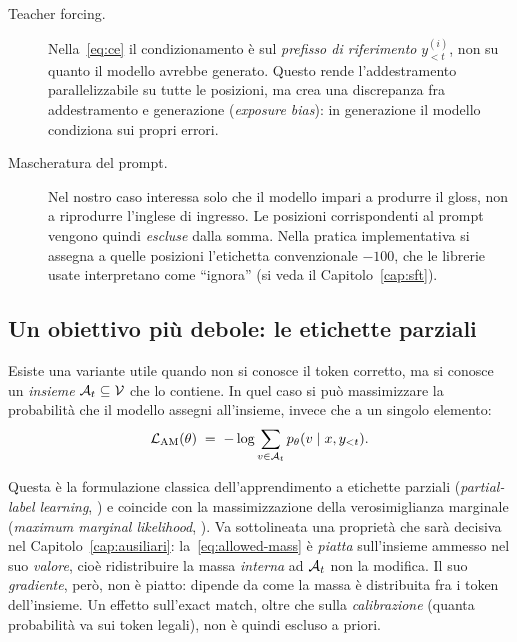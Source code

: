 \begin{description}
  \item[Teacher forcing.] Nella~\eqref{eq:ce} il condizionamento è sul
        \emph{prefisso di riferimento} $y^{(i)}_{<t}$, non su quanto il modello
        avrebbe generato. Questo rende l'addestramento parallelizzabile su tutte
        le posizioni, ma crea una discrepanza fra addestramento e generazione
        (\emph{exposure bias}): in generazione il modello condiziona sui propri
        errori.
  \item[Mascheratura del prompt.] Nel nostro caso interessa solo che il modello
        impari a produrre il gloss, non a riprodurre l'inglese di ingresso. Le
        posizioni corrispondenti al prompt vengono quindi \emph{escluse} dalla
        somma. Nella pratica implementativa si assegna a quelle posizioni
        l'etichetta convenzionale $-100$, che le librerie usate interpretano come
        ``ignora'' (si veda il Capitolo~\ref{cap:sft}).
\end{description}

\subsection{Un obiettivo più debole: le etichette parziali}
\label{sec:partial-label}

Esiste una variante utile quando non si conosce il token corretto, ma si conosce
un \emph{insieme} $\mathcal{A}_t \subseteq \mathcal{V}$ che lo contiene. In quel caso si
può massimizzare la probabilità che il modello assegni all'insieme, invece che a
un singolo elemento:
\begin{equation}
  \label{eq:allowed-mass}
  \mathcal{L}_{\text{AM}}(\theta)
  \;=\;
  -\log \sum_{v \in \mathcal{A}_t} p_\theta(v \mid x, y_{<t}).
\end{equation}

Questa è la formulazione classica dell'apprendimento a etichette parziali
(\emph{partial-label learning}, \cite{cour2011partial}) e coincide con la
massimizzazione della verosimiglianza marginale (\emph{maximum marginal
likelihood}, \cite{guu2017mml}). Va sottolineata una proprietà che sarà decisiva
nel Capitolo~\ref{cap:ausiliari}: la~\eqref{eq:allowed-mass} è \emph{piatta}
sull'insieme ammesso nel suo \emph{valore}, cioè ridistribuire la massa
\emph{interna} ad $\mathcal{A}_t$ non la modifica. Il suo \emph{gradiente}, però,
non è piatto: dipende da come la massa è distribuita fra i token dell'insieme.
Un effetto sull'exact match, oltre che sulla \emph{calibrazione} (quanta
probabilità va sui token legali), non è quindi escluso a priori.

